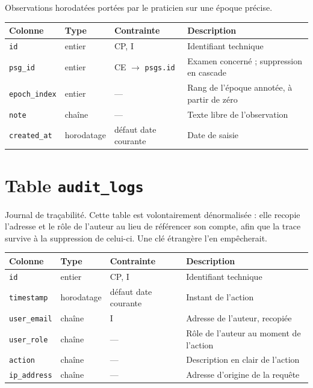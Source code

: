 Observations horodatées portées par le praticien sur une époque précise.

\begin{table}[H]
\centering
\small
\begin{tabular}{@{}lllL{6.0cm}@{}}
\toprule
\textbf{Colonne} & \textbf{Type} & \textbf{Contrainte} & \textbf{Description} \\
\midrule
\texttt{id}          & entier     & CP, I & Identifiant technique \\
\texttt{psg\_id}     & entier     & CE $\to$ \texttt{psgs.id} & Examen concerné ;
                                             suppression en cascade \\
\texttt{epoch\_index}& entier     & --- & Rang de l'époque annotée, à partir de zéro \\
\texttt{note}        & chaîne     & --- & Texte libre de l'observation \\
\texttt{created\_at} & horodatage & défaut date courante & Date de saisie \\
\bottomrule
\end{tabular}
\end{table}

\section{Table \texttt{audit\_logs}}

Journal de traçabilité. Cette table est volontairement dénormalisée : elle
recopie l'adresse et le rôle de l'auteur au lieu de référencer son compte, afin que la
trace survive à la suppression de celui-ci. Une clé étrangère l'en empêcherait.

\begin{table}[H]
\centering
\small
\begin{tabular}{@{}lllL{6.0cm}@{}}
\toprule
\textbf{Colonne} & \textbf{Type} & \textbf{Contrainte} & \textbf{Description} \\
\midrule
\texttt{id}          & entier     & CP, I & Identifiant technique \\
\texttt{timestamp}   & horodatage & défaut date courante & Instant de l'action \\
\texttt{user\_email} & chaîne     & I & Adresse de l'auteur, recopiée \\
\texttt{user\_role}  & chaîne     & --- & Rôle de l'auteur au moment de l'action \\
\texttt{action}      & chaîne     & --- & Description en clair de l'action \\
\texttt{ip\_address} & chaîne     & --- & Adresse d'origine de la requête \\
\bottomrule
\end{tabular}
\end{table}


